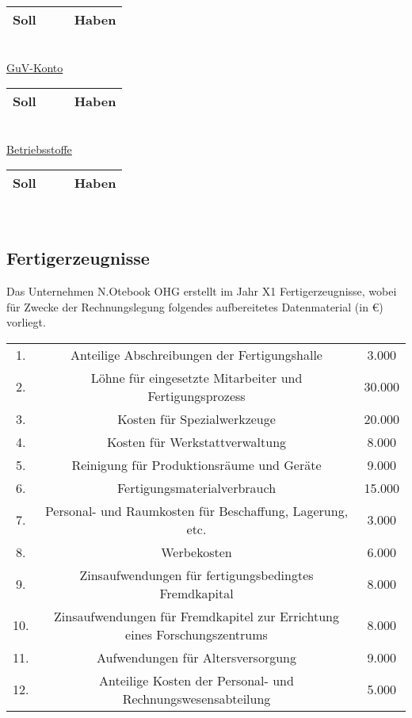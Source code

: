 \documentclass[paper=a4, fontsize=11pt]{scrartcl}
\numberwithin{equation}{section}
\numberwithin{figure}{section}
\numberwithin{table}{section}
\begin{document}
{\begin{tabular}{cc|cc}
\hline
Soll & & & Haben \\
\hline
\end{tabular}
\\

\underline{GuV-Konto}

\begin{tabular}{cc|cc}
\hline
Soll & & & Haben \\
\hline
\end{tabular}
\\

\underline{Betriebsstoffe}

\begin{tabular}{cc|cc}
\hline
Soll & & & Haben \\
\hline
\end{tabular}
\\


\subsection{Fertigerzeugnisse}

Das Unternehmen N.Otebook OHG erstellt im Jahr X1 Fertigerzeugnisse, wobei für Zwecke der Rechnungslegung folgendes aufbereitetes Datenmaterial (in €) vorliegt. \\

\begin{tabular}{ccc}
1. & Anteilige Abschreibungen der Fertigungshalle & 3.000 \\
2. & Löhne für eingesetzte Mitarbeiter und Fertigungsprozess & 30.000 \\
3. & Kosten für Spezialwerkzeuge & 20.000 \\
4. & Kosten für Werkstattverwaltung & 8.000 \\
5. & Reinigung für Produktionsräume und Geräte & 9.000 \\
6. & Fertigungsmaterialverbrauch & 15.000 \\
7. & Personal- und Raumkosten für Beschaffung, Lagerung, etc.  & 3.000 \\
8. & Werbekosten & 6.000 \\
9. & Zinsaufwendungen für fertigungsbedingtes Fremdkapital & 8.000 \\
10. & Zinsaufwendungen für Fremdkapitel zur Errichtung eines Forschungszentrums & 8.000 \\
11. & Aufwendungen für Altersversorgung & 9.000 \\
12. & Anteilige Kosten der Personal- und Rechnungswesensabteilung & 5.000 \\
\end{tabular}

}
\end{document}

